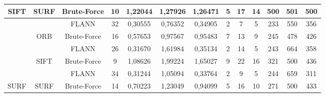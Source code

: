 \begin{table}[h!]
{\begin{tabular}{|c|c|c|c|c|c|c|c|c|c|c|c|c|}
				\multirow{-6}{*}{SIFT}   & \multirow{-2}{*}{SURF} & Brute-Force & 10                         & 1,22044                         & 1,27926                         & 1,26471                         & 5                         & 17                         & 14                        & 500                         & 501 & 500                         \\ \hline
				&                        & FLANN       & \cellcolor[HTML]{32CB00}32 & \cellcolor[HTML]{32CB00}0,30555 & \cellcolor[HTML]{32CB00}0,76352 & \cellcolor[HTML]{32CB00}0,34905 & \cellcolor[HTML]{32CB00}2 & \cellcolor[HTML]{32CB00}7  & \cellcolor[HTML]{32CB00}5 & \cellcolor[HTML]{32CB00}233 & 550 & \cellcolor[HTML]{32CB00}356 \\ \cline{3-13} 
				& \multirow{-2}{*}{ORB}  & Brute-Force & 16                         & 0,57653                         & \cellcolor[HTML]{32CB00}0,97567 & 0,95483                         & 7                         & \cellcolor[HTML]{32CB00}13 & 9                         & 245                         & 478 & 426                         \\ \cline{2-13} 
				&                        & FLANN       & \cellcolor[HTML]{32CB00}26 & \cellcolor[HTML]{32CB00}0,31670 & 1,61984                         & \cellcolor[HTML]{32CB00}0,35134 & \cellcolor[HTML]{32CB00}2 & \cellcolor[HTML]{32CB00}14 & \cellcolor[HTML]{32CB00}5 & \cellcolor[HTML]{32CB00}243 & 664 & \cellcolor[HTML]{32CB00}358 \\ \cline{3-13} 
				& \multirow{-2}{*}{SIFT} & Brute-Force & 9                          & 1,08626                         & 1,99224                         & 1,65027                         & 9                         & 22                         & 16                        & 321                         & 500 & 436                         \\ \cline{2-13} 
				&                        & FLANN       & \cellcolor[HTML]{32CB00}34 & \cellcolor[HTML]{32CB00}0,31244 & \cellcolor[HTML]{32CB00}1,05094 & \cellcolor[HTML]{32CB00}0,33764 & \cellcolor[HTML]{32CB00}2 & \cellcolor[HTML]{32CB00}9  & \cellcolor[HTML]{32CB00}5 & \cellcolor[HTML]{32CB00}244 & 659 & \cellcolor[HTML]{32CB00}311 \\ \cline{3-13} 
				\multirow{-6}{*}{SURF}   & \multirow{-2}{*}{SURF} & Brute-Force & 14                         & 0,70223                         & 1,23049                         & 0,94099                         & 5                         & 16                         & 10                        & 271                         & 500 & 433                         \\ \hline
		\end{tabular}}
\end{table}



